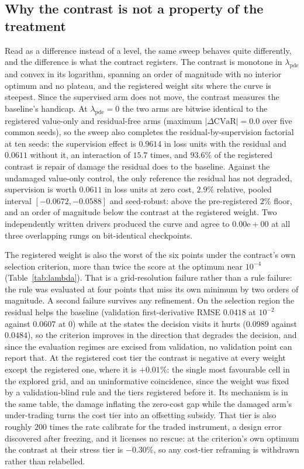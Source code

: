 \documentclass{article}
\begin{document}
\subsection{Why the contrast is not a property of the treatment}
\label{sec:readout}

Read as a difference instead of a level, the same sweep behaves quite differently,
and the difference is what the contract registers. The contrast is monotone in
$\lambda_{\mathrm{pde}}$ and convex in its logarithm, spanning an order of magnitude
with no interior optimum and no plateau, and the registered weight sits where the
curve is steepest. Since the supervised arm does not move, the contrast measures the
baseline's handicap. At $\lambda_{\mathrm{pde}} = 0$ the two arms are bitwise
identical to the registered value-only and residual-free arms (maximum
$|\Delta\mathrm{CVaR}| = 0.0$ over five common seeds), so the sweep also completes
the residual-by-supervision factorial at ten seeds: the supervision effect is
$0.9614$ in loss units with the residual and $0.0611$ without it, an interaction of
$15.7$ times, and $93.6\%$ of the registered contrast is repair of damage the
residual does to the baseline. Against the undamaged value-only control, the only
reference the residual has not degraded, supervision is worth $0.0611$ in loss units at zero
cost, $2.9\%$ relative, pooled interval $[-0.0672, -0.0588]$ and seed-robust: above
the pre-registered $2\%$ floor, and an order of magnitude below the contrast at the
registered weight. Two independently written
drivers produced the curve and agree to $0.00\mathrm{e}{+}00$ at all three
overlapping rungs on bit-identical checkpoints.

The registered weight is also the worst of the six points under the contract's own
selection criterion, more than twice the score at the optimum near $10^{-4}$
(Table~\ref{tab:lambda}). That is a grid-resolution failure rather than a rule failure: the rule was evaluated
at four points that miss its own minimum by two orders of magnitude. A second
failure survives any refinement. On the selection region the residual helps the
baseline (validation first-derivative RMSE $0.0418$ at $10^{-2}$ against $0.0607$ at
$0$) while at the states the decision visits it hurts ($0.0989$ against $0.0484$),
so the criterion improves in the direction that degrades the decision, and since the
evaluation regimes are excised from validation, no validation point can report that.
At the registered cost tier the contrast is negative at every weight except the
registered one, where it is $+0.01\%$: the single most favourable cell in the
explored grid, and an uninformative coincidence, since the weight was fixed by a
validation-blind rule and the tiers registered before it. Its mechanism is in the
same table, the damage inflating the zero-cost gap while the damaged arm's
under-trading turns the cost tier into an offsetting subsidy. That tier is also roughly $200$ times the rate
\citet{armstrong2024deep} calibrate for the traded instrument, a design error
discovered after freezing, and it licenses no rescue: at the criterion's own optimum
the contrast at their stress tier is $-0.30\%$, so any cost-tier reframing is
withdrawn rather than relabelled.
\end{document}
